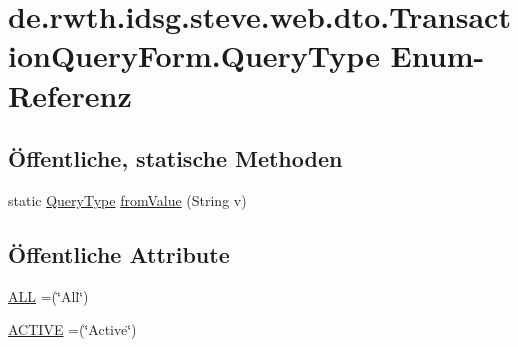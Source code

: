 \hypertarget{enumde_1_1rwth_1_1idsg_1_1steve_1_1web_1_1dto_1_1_transaction_query_form_1_1_query_type}{\section{de.\-rwth.\-idsg.\-steve.\-web.\-dto.\-Transaction\-Query\-Form.\-Query\-Type Enum-\/\-Referenz}
\label{enumde_1_1rwth_1_1idsg_1_1steve_1_1web_1_1dto_1_1_transaction_query_form_1_1_query_type}
}
\subsection*{Öffentliche, statische Methoden}
\begin{DoxyCompactItemize}
\item 
static \hyperlink{enumde_1_1rwth_1_1idsg_1_1steve_1_1web_1_1dto_1_1_transaction_query_form_1_1_query_type}{Query\-Type} \hyperlink{enumde_1_1rwth_1_1idsg_1_1steve_1_1web_1_1dto_1_1_transaction_query_form_1_1_query_type_a1a0aeadced9c7cf2e3425a2bffb6682d}{from\-Value} (String v)
\end{DoxyCompactItemize}
\subsection*{Öffentliche Attribute}
\begin{DoxyCompactItemize}
\item 
\hyperlink{enumde_1_1rwth_1_1idsg_1_1steve_1_1web_1_1dto_1_1_transaction_query_form_1_1_query_type_a2d65ed09e38c3b1847a09a7b3573d970}{A\-L\-L} =(\char`\"{}All\char`\"{})
\item 
\hyperlink{enumde_1_1rwth_1_1idsg_1_1steve_1_1web_1_1dto_1_1_transaction_query_form_1_1_query_type_a6e5259bb3f9eda13b9a7373d957da90a}{A\-C\-T\-I\-V\-E} =(\char`\"{}Active\char`\"{})
\end{DoxyCompactItemize}



